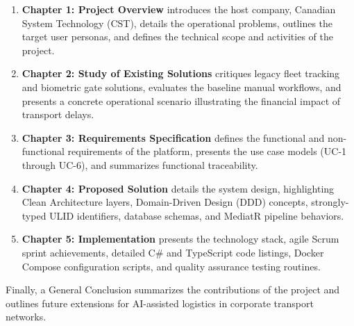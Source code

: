 \begin{enumerate}
  \item \textbf{Chapter 1: Project Overview} introduces the host company, Canadian System Technology (CST), details the operational problems, outlines the target user personas, and defines the technical scope and activities of the project.
  \item \textbf{Chapter 2: Study of Existing Solutions} critiques legacy fleet tracking and biometric gate solutions, evaluates the baseline manual workflows, and presents a concrete operational scenario illustrating the financial impact of transport delays.
  \item \textbf{Chapter 3: Requirements Specification} defines the functional and non-functional requirements of the platform, presents the use case models (UC-1 through UC-6), and summarizes functional traceability.
  \item \textbf{Chapter 4: Proposed Solution} details the system design, highlighting Clean Architecture layers, Domain-Driven Design (DDD) concepts, strongly-typed ULID identifiers, database schemas, and MediatR pipeline behaviors.
  \item \textbf{Chapter 5: Implementation} presents the technology stack, agile Scrum sprint achievements, detailed C\# and TypeScript code listings, Docker Compose configuration scripts, and quality assurance testing routines.
\end{enumerate}

Finally, a General Conclusion summarizes the contributions of the project and outlines future extensions for AI-assisted logistics in corporate transport networks.